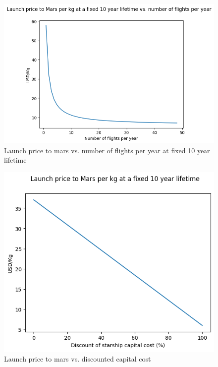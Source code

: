 \documentclass[fleqn,10pt]{Stylesheet} %
\begin{document}
\begin{figure}
    \centering
    \includegraphics[width=\linewidth]{fig_numflights.png}
    \caption{Launch price to mars vs. number of flights per year at fixed 10 year lifetime}
    \label{fig:numflights}
\end{figure}


\begin{figure}
    \centering
    \includegraphics[width=\linewidth]{fig_discflights.png}
    \caption{Launch price to mars vs. discounted capital cost}
    \label{fig:flight_cost_cap}
\end{figure}
\end{document}
